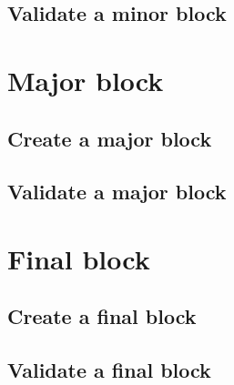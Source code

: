 \documentclass[../hydrozoa.tex]{subfiles}
\begin{document}

\subsection{Validate a minor block}%
\label{h:l2-minor-block-validate}%


\section{Major block}%
\label{h:l2-major-block}%


\subsection{Create a major block}%
\label{h:l2-major-block-create}%


\subsection{Validate a major block}%
\label{h:l2-major-block-validate}%



\section{Final block}%
\label{h:l2-final-block}%


\subsection{Create a final block}%
\label{h:l2-final-block-create}%


\subsection{Validate a final block}%
\label{h:l2-final-block-validate}%

\end{document}
